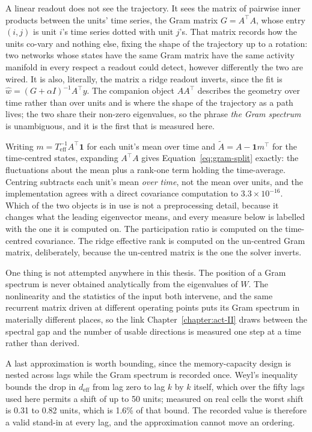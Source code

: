 A linear readout does not see the trajectory. It sees the matrix of pairwise
inner products between the units' time series, the Gram matrix $G = A^{\top}A$,
whose entry $(i,j)$ is unit $i$'s time series dotted with unit $j$'s. That matrix
records how the units co-vary and nothing else, fixing the shape of the
trajectory up to a rotation: two networks whose states have the same Gram matrix
have the same activity manifold in every respect a readout could detect, however
differently the two are wired. It is also, literally, the matrix a ridge readout
inverts, since the fit is
$\hat{w} = (G + \alpha I)^{-1}A^{\top}y$. The companion object $AA^{\top}$
describes the geometry over time rather than over units and is where the shape of
the trajectory as a path lives; the two share their non-zero eigenvalues, so the
phrase \emph{the Gram spectrum} is unambiguous, and it is the first that is
measured here.

Writing $m = T_{\mathrm{eff}}^{-1}A^{\top}\mathbf{1}$ for each unit's mean over
time and $\tilde{A} = A - \mathbf{1}m^{\top}$ for the time-centred states,
expanding $A^{\top}A$ gives Equation~\ref{eq:gram-split} exactly: the
fluctuations about the mean plus a rank-one term holding the time-average.
Centring subtracts each unit's mean \emph{over time}, not the mean over units,
and the implementation agrees with a direct covariance computation to
$3.3 \times 10^{-16}$. %
Which of the two objects is in use is not a preprocessing detail, because it
changes what the leading eigenvector means, and every measure below is labelled
with the one it is computed on. The participation ratio is computed on the
time-centred covariance. The ridge effective rank is computed on the un-centred
Gram matrix, deliberately, because the un-centred matrix is the one the solver
inverts.

One thing is not attempted anywhere in this thesis. The position of a Gram
spectrum is never obtained analytically from the eigenvalues of $W$. The
nonlinearity and the statistics of the input both intervene, and the same
recurrent matrix driven at different operating points puts its Gram spectrum in
materially different places, so the link Chapter~\ref{chapter:act-II} draws
between the spectral gap and the number of usable directions is measured one step
at a time rather than derived.

A last approximation is worth bounding, since the memory-capacity design is
nested across lags while the Gram spectrum is recorded once. Weyl's inequality
bounds the drop in $d_{\mathrm{eff}}$ from lag zero to lag $k$ by $k$ itself,
which over the fifty lags used here permits a shift of up to
50 units; %
measured on real cells the worst shift is
0.31 to 0.82 units, %
which is 1.6\% %
of that bound. The recorded value is therefore a valid stand-in at every lag, and
the approximation cannot move an ordering.


